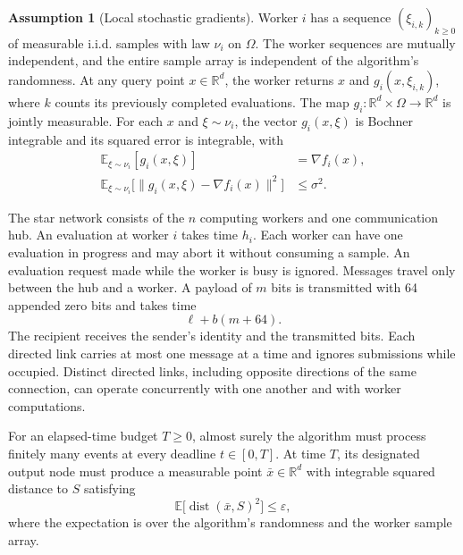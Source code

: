 \documentclass[10pt]{article}
\theoremstyle{definition}
\newtheorem{assumption}{Assumption}
\begin{document}
\begin{assumption}[Local stochastic gradients]
Worker $i$ has a sequence $(\xi_{i,k})_{k\geq 0}$ of measurable i.i.d. samples with law $\nu_i$ on $\Omega$. The worker sequences are mutually independent, and the entire sample array is independent of the algorithm's randomness. At any query point $x\in\mathbb{R}^d$, the worker returns $x$ and $g_i(x,\xi_{i,k})$, where $k$ counts its previously completed evaluations. The map $g_i:\mathbb{R}^d\times\Omega\to\mathbb{R}^d$ is jointly measurable. For each $x$ and $\xi\sim\nu_i$, the vector $g_i(x,\xi)$ is Bochner integrable and its squared error is integrable, with
\[
\begin{aligned}
\mathbb{E}_{\xi\sim\nu_i}[g_i(x,\xi)]&=\nabla f_i(x),\\
\mathbb{E}_{\xi\sim\nu_i}\bigl[\|g_i(x,\xi)-\nabla f_i(x)\|^2\bigr]&\leq\sigma^2.
\end{aligned}
\]
\end{assumption}

The star network consists of the $n$ computing workers and one communication hub. An evaluation at worker $i$ takes time $h_i$. Each worker can have one evaluation in progress and may abort it without consuming a sample. An evaluation request made while the worker is busy is ignored. Messages travel only between the hub and a worker. A payload of $m$ bits is transmitted with 64 appended zero bits and takes time
\[
\ell+b(m+64).
\]
The recipient receives the sender's identity and the transmitted bits. Each directed link carries at most one message at a time and ignores submissions while occupied. Distinct directed links, including opposite directions of the same connection, can operate concurrently with one another and with worker computations.

For an elapsed-time budget $T\geq 0$, almost surely the algorithm must process finitely many events at every deadline $t\in[0,T]$. At time $T$, its designated output node must produce a measurable point $\bar{x}\in\mathbb{R}^d$ with integrable squared distance to $S$ satisfying
\[
\mathbb{E}\bigl[\operatorname{dist}(\bar{x},S)^2\bigr]\leq\varepsilon,
\]
where the expectation is over the algorithm's randomness and the worker sample array.
\end{document}
